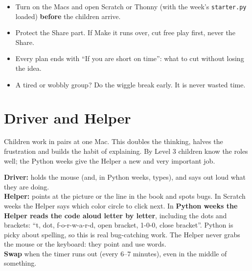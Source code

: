 \documentclass[track=junior,level=3,teacher]{kidscode}
\begin{document}
\begin{tip}
\begin{itemize}[itemsep=1pt]
  \item Turn on the Macs and open Scratch or Thonny (with the week's \texttt{starter.py} loaded) \textbf{before} the children arrive.
  \item Protect the Share part. If Make it runs over, cut free play first, never the Share.
  \item Every plan ends with \enquote{If you are short on time}: what to cut without losing the idea.
  \item A tired or wobbly group? Do the wiggle break early. It is never wasted time.
\end{itemize}
\end{tip}

\section{Driver and Helper}
Children work in pairs at one Mac. This doubles the thinking, halves the frustration and builds
the habit of explaining. By Level 3 children know the roles well; the Python weeks give the Helper
a new and very important job.

\begin{pairroles}
\textbf{Driver:} holds the mouse (and, in Python weeks, types), and says out loud what they are doing.\\
\textbf{Helper:} points at the picture or the line in the book and spots bugs. In Scratch weeks the
Helper says which color circle to click next. In \textbf{Python weeks the Helper reads the code
aloud letter by letter}, including the dots and brackets: \enquote{t, dot, f-o-r-w-a-r-d, open bracket,
1-0-0, close bracket}. Python is picky about spelling, so this is real bug-catching work. The Helper
never grabs the mouse or the keyboard: they point and use words.\\
\textbf{Swap} when the timer runs out (every 6--7 minutes), even in the middle of something.
\end{pairroles}
\end{document}
